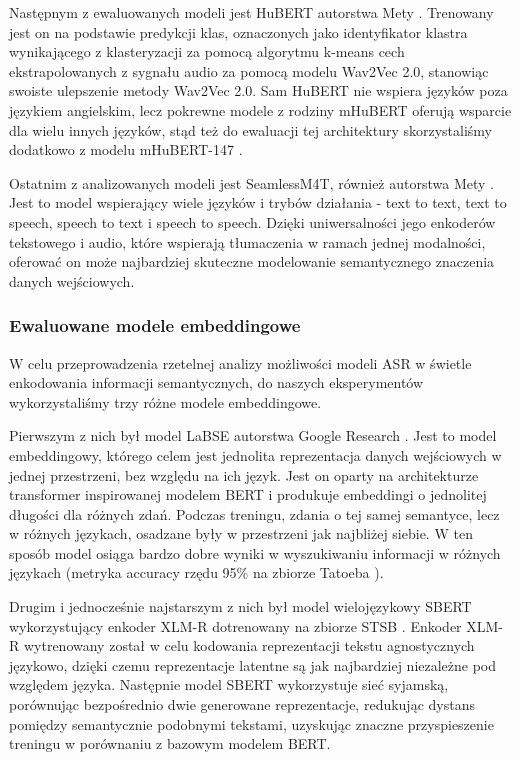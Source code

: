 Następnym z ewaluowanych modeli jest HuBERT autorstwa Mety \cite{hsu2021hubert}. Trenowany jest on na podstawie predykcji klas, oznaczonych jako identyfikator klastra wynikającego z klasteryzacji za pomocą algorytmu k-means cech ekstrapolowanych z sygnału audio za pomocą modelu Wav2Vec 2.0, stanowiąc swoiste ulepszenie metody Wav2Vec 2.0. Sam HuBERT nie wspiera języków poza językiem angielskim, lecz pokrewne modele z rodziny mHuBERT oferują wsparcie dla wielu innych języków, stąd też do ewaluacji tej architektury skorzystaliśmy dodatkowo z modelu mHuBERT-147 \cite{mhubert}.

Ostatnim z analizowanych modeli jest SeamlessM4T, również autorstwa Mety \cite{m4t}. Jest to model wspierający wiele języków i trybów działania - text to text, text to speech, speech to text i speech to speech. Dzięki uniwersalności jego enkoderów tekstowego i audio, które wspierają tłumaczenia w ramach jednej modalności, oferować on może najbardziej skuteczne modelowanie semantycznego znaczenia danych wejściowych.

\subsubsection{Ewaluowane modele embeddingowe}
W celu przeprowadzenia rzetelnej analizy możliwości modeli ASR w świetle enkodowania informacji semantycznych, do naszych eksperymentów wykorzystaliśmy trzy różne modele embeddingowe.

Pierwszym z nich był model LaBSE autorstwa Google Research \cite{feng-etal-2022-language}. Jest to model embeddingowy, którego celem jest jednolita reprezentacja danych wejściowych w jednej przestrzeni, bez względu na ich język. Jest on oparty na architekturze transformer inspirowanej modelem BERT i produkuje embeddingi o jednolitej długości dla różnych zdań. Podczas treningu, zdania o tej samej semantyce, lecz w różnych językach, osadzane były w przestrzeni jak najbliżej siebie. W ten sposób model osiąga bardzo dobre wyniki w wyszukiwaniu informacji w różnych językach (metryka accuracy rzędu 95\% na zbiorze Tatoeba \cite{tiedemann-2020-tatoeba}).

Drugim i jednocześnie najstarszym z nich był model wielojęzykowy SBERT \cite{sbert} wykorzystujący enkoder XLM-R \cite{xlm} dotrenowany na zbiorze STSB \cite{stsb}. Enkoder XLM-R wytrenowany został w celu kodowania reprezentacji tekstu agnostycznych językowo, dzięki czemu reprezentacje latentne są jak najbardziej niezależne pod względem języka. Następnie model SBERT wykorzystuje sieć syjamską, porównując bezpośrednio dwie generowane reprezentacje, redukując dystans pomiędzy semantycznie podobnymi tekstami, uzyskując znaczne przyspieszenie treningu w porównaniu z bazowym modelem BERT.

